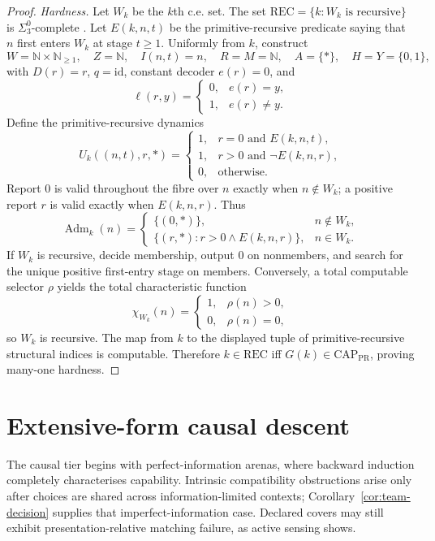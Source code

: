 \documentclass[11pt]{article}
\theoremstyle{plain}
\theoremstyle{definition}
\theoremstyle{remark}
\newcommand{\N}{\mathbb{N}}
\newcommand{\Adm}{\operatorname{Adm}}
\begin{document}
\begin{proof}
\emph{Hardness.} Let $W_k$ be the $k$th c.e. set. The set
$\mathrm{REC}=\{k:W_k\text{ is recursive}\}$ is $\Sigma^0_3$-complete
\cite{soare}. Let $E(k,n,t)$ be the primitive-recursive predicate saying that
$n$ first enters $W_k$ at stage $t\ge1$. Uniformly from $k$, construct
\[
W=\N\times\N_{\ge1},\quad Z=\N,\quad I(n,t)=n,
\quad R=M=\N,\quad A=\{\ast\},\quad H=Y=\{0,1\},
\]
with $D(r)=r$, $q=\mathrm{id}$, constant decoder $e(r)=0$, and
\[
\ell(r,y)=
\begin{cases}0,&e(r)=y,\\1,&e(r)\ne y.\end{cases}
\]
Define the primitive-recursive dynamics
\[
U_k((n,t),r,\ast)=
\begin{cases}
1,&r=0\text{ and }E(k,n,t),\\
1,&r>0\text{ and }\neg E(k,n,r),\\
0,&\text{otherwise}.
\end{cases}
\]
Report $0$ is valid throughout the fibre over $n$ exactly when
$n\notin W_k$; a positive report $r$ is valid exactly when $E(k,n,r)$. Thus
\[
\Adm_k(n)=
\begin{cases}
\{(0,\ast)\},&n\notin W_k,\\
\{(r,\ast):r>0\land E(k,n,r)\},&n\in W_k.
\end{cases}
\]
If $W_k$ is recursive, decide membership, output $0$ on nonmembers, and search
for the unique positive first-entry stage on members. Conversely, a total
computable selector $\rho$ yields the total characteristic function
\[
\chi_{W_k}(n)=
\begin{cases}1,&\rho(n)>0,\\0,&\rho(n)=0,\end{cases}
\]
so $W_k$ is recursive. The map from $k$ to the displayed tuple of
primitive-recursive structural indices is computable. Therefore
$k\in\mathrm{REC}$ iff $G(k)\in\mathrm{CAP}_{\mathrm{PR}}$, proving many-one
hardness.
\end{proof}

\section{Extensive-form causal descent}\label{sec:feedback}

The causal tier begins with perfect-information arenas, where backward induction
completely characterises capability. Intrinsic compatibility obstructions arise
only after choices are shared across information-limited contexts; Corollary~\ref{cor:team-decision} supplies that imperfect-information case. Declared
covers may still exhibit presentation-relative matching failure, as active
sensing shows.
\end{document}
